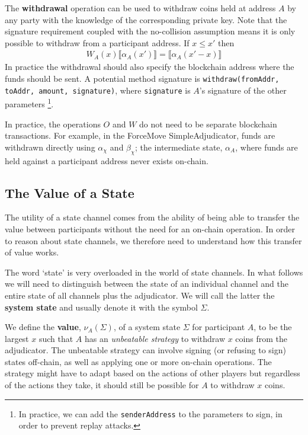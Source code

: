 \documentclass{article}
\theoremstyle{definition}
\newcommand{\adj}[1]{\llbracket #1 \rrbracket}
\begin{document}
The \textbf{withdrawal} operation can be used to withdraw coins held at address $A$ by any
party with the knowledge of the corresponding private key. 
Note that the signature requirement coupled with the no-collision assumption means
it is only possible to withdraw from a participant address.
If $x \leq x'$ then
\begin{align*}
W_A(x) \adj{\alpha_A(x')} = \adj{\alpha_A(x'-x)}
\end{align*}
In practice the withdrawal should also specify the blockchain address where the funds should be sent.
A potential method signature is \texttt{withdraw(fromAddr, toAddr, amount, signature)}, 
where \texttt{signature} is $A$'s signature of the other parameters
\footnote{In practice, we can add the \texttt{senderAddress} to the parameters to sign,
in order to prevent replay attacks.}.

In practice, the operations $O$ and $W$ do not need to be separate blockchain transactions.
For example, in the ForceMove SimpleAdjudicator, funds are withdrawn directly using $\alpha_\chi$ and $\beta_\chi$;
the intermediate state, $\alpha_A$, where funds are held against a participant address never exists on-chain.

\subsection{The Value of a State}

The utility of a state channel comes from the ability of being able to transfer the value
between participants without the need for an on-chain operation.
In order to reason about state channels, we therefore need to understand how this transfer
of value works.

The word `state' is very overloaded in the world of state channels.
In what follows we will need to distinguish between the state of an individual channel and
the entire state of all channels plus the adjudicator.
We will call the latter the \textbf{system state} and usually denote it with the symbol $\Sigma$.

We define the \textbf{value}, $\nu_A(\Sigma)$, of a system state $\Sigma$ for participant $A$,
to be the largest $x$ such that $A$ has an \textit{unbeatable strategy} to withdraw $x$
coins from the adjudicator.
The unbeatable strategy can involve signing (or refusing to sign) states off-chain, as well as
applying one or more on-chain operations.
The strategy might have to adapt based on the actions of other players but regardless of
the actions they take, it should still be possible for $A$ to withdraw $x$ coins.
\end{document}
